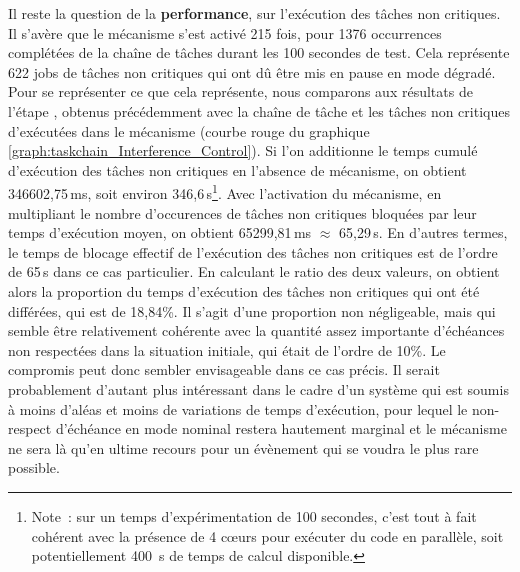 \documentclass[french, a4paper, 11pt, twoside, pdftex]{StyleThese}
\begin{document}
Il reste la question de la \textbf{performance}, sur l'exécution des tâches non critiques. Il s'avère que le mécanisme s'est activé 215 fois, pour 1376 occurrences complétées de la chaîne de tâches durant les 100 secondes de test. Cela représente 622 jobs de tâches non critiques qui ont dû être mis en pause en mode dégradé.
Pour se représenter ce que cela représente, nous comparons aux résultats de l'étape , obtenus précédemment avec la chaîne de tâche et les tâches non critiques d'exécutées dans le mécanisme (courbe rouge du graphique \ref{graph:taskchain_Interference_Control}). Si l'on additionne le temps cumulé d'exécution des tâches non critiques en l'absence de mécanisme, on obtient 346602,75\,ms, soit environ 346,6\,s\footnote{Note~: sur un temps d'expérimentation de 100 secondes, c'est tout à fait cohérent avec la présence de 4 cœurs pour exécuter du code en parallèle, soit potentiellement 400~s de temps de calcul disponible.}. Avec l'activation du mécanisme, en multipliant le nombre d'occurences de tâches non critiques bloquées par leur temps d'exécution moyen, on obtient 65299,81\,ms $\approx$ 65,29\,s. En d'autres termes, le temps de blocage effectif de l'exécution des tâches non critiques est de l'ordre de 65\,s dans ce cas particulier. En calculant le ratio des deux valeurs, on obtient alors la proportion du temps d'exécution des tâches non critiques qui ont été différées, qui est de 18,84\%. Il s'agit d'une proportion non négligeable, mais qui semble être relativement cohérente avec la quantité assez importante d'échéances non respectées dans la situation initiale, qui était de l'ordre de 10\%. Le compromis peut donc sembler envisageable dans ce cas précis. Il serait probablement d'autant plus intéressant dans le cadre d'un système qui est soumis à moins d'aléas et moins de variations de temps d'exécution, pour lequel le non-respect d'échéance en mode nominal restera hautement marginal et le mécanisme ne sera là qu'en ultime recours pour un évènement qui se voudra le plus rare possible.
\end{document}

